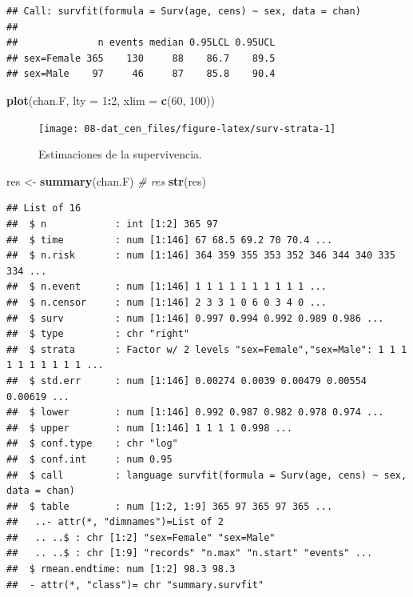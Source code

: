 \documentclass[]{book}
\newenvironment{Shaded}{\begin{snugshade}}{\end{snugshade}}
\newcommand{\KeywordTok}[1]{\textcolor[rgb]{0.13,0.29,0.53}{\textbf{#1}}}
\newcommand{\DataTypeTok}[1]{\textcolor[rgb]{0.13,0.29,0.53}{#1}}
\newcommand{\DecValTok}[1]{\textcolor[rgb]{0.00,0.00,0.81}{#1}}
\newcommand{\StringTok}[1]{\textcolor[rgb]{0.31,0.60,0.02}{#1}}
\newcommand{\CommentTok}[1]{\textcolor[rgb]{0.56,0.35,0.01}{\textit{#1}}}
\newcommand{\OperatorTok}[1]{\textcolor[rgb]{0.81,0.36,0.00}{\textbf{#1}}}
\newcommand{\NormalTok}[1]{#1}
\theoremstyle{definition}
\theoremstyle{definition}
\theoremstyle{definition}
\theoremstyle{remark}
\begin{document}
\begin{verbatim}
## Call: survfit(formula = Surv(age, cens) ~ sex, data = chan)
## 
##              n events median 0.95LCL 0.95UCL
## sex=Female 365    130     88    86.7    89.5
## sex=Male    97     46     87    85.8    90.4
\end{verbatim}

\begin{Shaded}
\begin{Highlighting}[]
\KeywordTok{plot}\NormalTok{(chan.F, }\DataTypeTok{lty =} \DecValTok{1}\OperatorTok{:}\DecValTok{2}\NormalTok{, }\DataTypeTok{xlim =} \KeywordTok{c}\NormalTok{(}\DecValTok{60}\NormalTok{, }\DecValTok{100}\NormalTok{))}
\end{Highlighting}
\end{Shaded}

\begin{figure}[!htb]

{\centering \texttt{[image: 08-dat\_cen\_files/figure-latex/surv-strata-1]} 

}

\caption{Estimaciones de la supervivencia.}\label{fig:surv-strata}
\end{figure}

\begin{Shaded}
\begin{Highlighting}[]
\NormalTok{res <-}\StringTok{ }\KeywordTok{summary}\NormalTok{(chan.F)}
\CommentTok{# res}
\KeywordTok{str}\NormalTok{(res)}
\end{Highlighting}
\end{Shaded}

\begin{verbatim}
## List of 16
##  $ n            : int [1:2] 365 97
##  $ time         : num [1:146] 67 68.5 69.2 70 70.4 ...
##  $ n.risk       : num [1:146] 364 359 355 353 352 346 344 340 335 334 ...
##  $ n.event      : num [1:146] 1 1 1 1 1 1 1 1 1 1 ...
##  $ n.censor     : num [1:146] 2 3 3 1 0 6 0 3 4 0 ...
##  $ surv         : num [1:146] 0.997 0.994 0.992 0.989 0.986 ...
##  $ type         : chr "right"
##  $ strata       : Factor w/ 2 levels "sex=Female","sex=Male": 1 1 1 1 1 1 1 1 1 1 ...
##  $ std.err      : num [1:146] 0.00274 0.0039 0.00479 0.00554 0.00619 ...
##  $ lower        : num [1:146] 0.992 0.987 0.982 0.978 0.974 ...
##  $ upper        : num [1:146] 1 1 1 1 0.998 ...
##  $ conf.type    : chr "log"
##  $ conf.int     : num 0.95
##  $ call         : language survfit(formula = Surv(age, cens) ~ sex, data = chan)
##  $ table        : num [1:2, 1:9] 365 97 365 97 365 ...
##   ..- attr(*, "dimnames")=List of 2
##   .. ..$ : chr [1:2] "sex=Female" "sex=Male"
##   .. ..$ : chr [1:9] "records" "n.max" "n.start" "events" ...
##  $ rmean.endtime: num [1:2] 98.3 98.3
##  - attr(*, "class")= chr "summary.survfit"
\end{verbatim}
\end{document}
